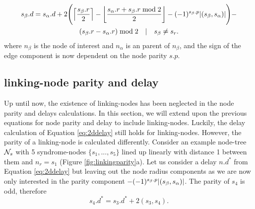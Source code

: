 \begin{multline}\label{eq:2ddelay}
  s_\beta.d = s_\alpha.d + 2\Bigg({\left \lceil \frac{s_\beta.r}{2} \right \rceil } - {\left \lfloor \frac{s_\alpha.r + s_\beta.r \bmod 2}{2} \right \rfloor } - (-1)^{s_\beta.p}\abs{(s_\beta,s_\alpha)}\Bigg) - \\
  (s_\beta.r - s_\alpha.r) \bmod 2 \hspace{1em} | \hspace{1em} s_\beta \neq s_r.
\end{multline}
where $n_\beta$ is the node of interest and $n_\alpha$ is an parent of $n_\beta$, and the sign of the edge component is now dependent on the node parity $s.p$.



\subsection{linking-node parity and delay}\label{sec:linkparitydelay}

Up until now, the existence of linking-nodes has been neglected in the node parity and delays calculations. In this section, we will extend upon the previous equations for node parity and delay to include linking-nodes. Luckily, the delay calculation of Equation \eqref{eq:2ddelay} still holds for linking-nodes. However, the parity of a linking-node is calculated differently. Consider an example node-tree $\mathcal{N}_s$ with 5 syndrome-nodes $\{s_1,...,s_5\}$ lined up linearly with distance 1 between them and $n_r = s_1$ (Figure \ref{fig:linkingparity}a). Let us consider a delay $n.d^*$ from Equation \eqref{eq:2ddelay} but leaving out the node radius components as we are now only interested in the parity component $- (-1)^{s_\beta.p}\abs{(s_\beta,s_\alpha)}$. The parity of $s_4$ is odd, therefore
\begin{equation*}
  s_4.d^* = s_3.d^* + 2(s_3, s_4).
\end{equation*}



